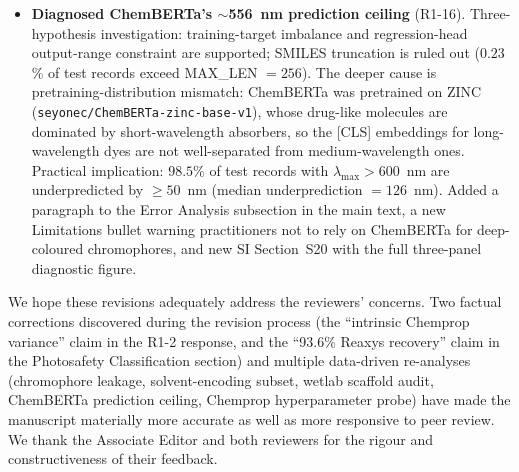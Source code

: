 \documentclass[11pt]{article}
\begin{document}
\begin{itemize}[leftmargin=2em]
  \item \textbf{Diagnosed ChemBERTa's $\sim$556~nm prediction ceiling} (R1-16). Three-hypothesis investigation: training-target imbalance and regression-head output-range constraint are supported; SMILES truncation is ruled out ($0.23$\% of test records exceed MAX\_LEN $= 256$). The deeper cause is pretraining-distribution mismatch: ChemBERTa was pretrained on ZINC (\texttt{seyonec/ChemBERTa-zinc-base-v1}), whose drug-like molecules are dominated by short-wavelength absorbers, so the [CLS] embeddings for long-wavelength dyes are not well-separated from medium-wavelength ones. Practical implication: $98.5$\% of test records with $\lambda_{\max} > 600$~nm are underpredicted by $\geq 50$~nm (median underprediction $= 126$~nm). Added a paragraph to the Error Analysis subsection in the main text, a new Limitations bullet warning practitioners not to rely on ChemBERTa for deep-coloured chromophores, and new SI Section~S20 with the full three-panel diagnostic figure.
\end{itemize}

\bigskip

We hope these revisions adequately address the reviewers' concerns. Two factual corrections discovered during the revision process (the ``intrinsic Chemprop variance'' claim in the R1-2 response, and the ``93.6\% Reaxys recovery'' claim in the Photosafety Classification section) and multiple data-driven re-analyses (chromophore leakage, solvent-encoding subset, wetlab scaffold audit, ChemBERTa prediction ceiling, Chemprop hyperparameter probe) have made the manuscript materially more accurate as well as more responsive to peer review. We thank the Associate Editor and both reviewers for the rigour and constructiveness of their feedback.



\end{document}
